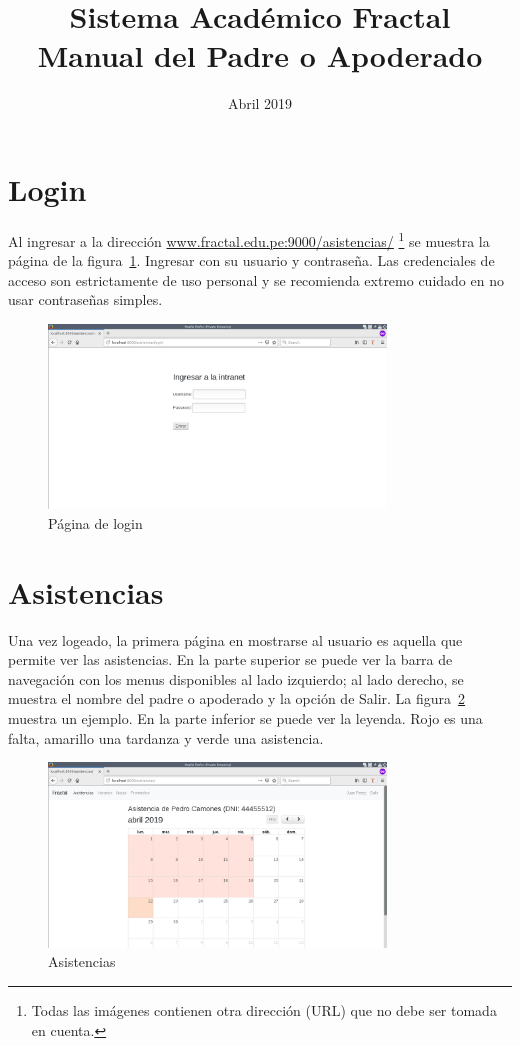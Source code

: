 \documentclass[12pt]{article}
\title{Sistema Acad\'emico Fractal\\Manual del Padre o Apoderado}
\date{Abril 2019}
\begin{document}
\maketitle

\section{Login}
Al ingresar a la direcci\'on \url{www.fractal.edu.pe:9000/asistencias/} 
\footnote{Todas las im\'agenes contienen otra direcci\'on (URL) que no debe ser tomada en cuenta.}
se muestra la p\'agina de la figura~\ref{fig:login}.
Ingresar con su usuario y contrase\~na. Las credenciales de acceso son estrictamente de uso personal y
se recomienda extremo cuidado en no usar contrase\~nas simples.
\begin{figure}[ht]
  \centering
  \includegraphics[width=0.8\textwidth]{images/login.png}
  \caption{P\'agina de login}
  \label{fig:login}
\end{figure}

\section{Asistencias}
Una vez logeado, la primera p\'agina en mostrarse al usuario es aquella que permite ver las asistencias.
En la parte superior se puede ver la barra de navegaci\'on con los menus
disponibles al lado izquierdo; al lado derecho, se muestra el nombre del padre o apoderado y
la opci\'on de Salir.
La figura~\ref{fig:asistencias} muestra un ejemplo. En la parte inferior se puede ver la leyenda. 
Rojo es una falta, amarillo una tardanza y verde una asistencia.
\begin{figure}[ht]
  \centering
  \includegraphics[width=0.8\textwidth]{images/apoderado1.png}
  \caption{Asistencias}
  \label{fig:asistencias}
\end{figure}
\end{document}
